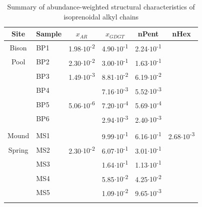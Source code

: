 \singlespace
\begin{table}
\centering
\begin{adjustbox}{width=\textwidth,keepaspectratio}
\begin{threeparttable}
  \caption{Summary of abundance-weighted structural characteristics of isoprenoidal alkyl chains}




\begin{tabular}{clllcc}
\toprule
Site  & Sample & \multicolumn{1}{c}{$x_{AR}$} & \multicolumn{1}{c}{$x_{GDGT}$} & nPent & nHex \\
\midrule
Bison & BP1   & 1.98$\cdot 10$\textsuperscript{-2} & 4.90$\cdot 10$\textsuperscript{-1} & 2.24$\cdot 10$\textsuperscript{-1} &  \\
Pool  & BP2   & 2.30$\cdot 10$\textsuperscript{-2} & 3.00$\cdot 10$\textsuperscript{-1} & 1.63$\cdot 10$\textsuperscript{-1} &  \\
      & BP3   & 1.49$\cdot 10$\textsuperscript{-3} & 8.81$\cdot 10$\textsuperscript{-2} & 6.19$\cdot 10$\textsuperscript{-2} &  \\
      & BP4   &       & 7.16$\cdot 10$\textsuperscript{-3} & 5.52$\cdot 10$\textsuperscript{-3} &  \\
      & BP5   & 5.06$\cdot 10$\textsuperscript{-6} & 7.20$\cdot 10$\textsuperscript{-4} & 5.69$\cdot 10$\textsuperscript{-4} &  \\
      & BP6   &       & 2.94$\cdot 10$\textsuperscript{-3} & 2.40$\cdot 10$\textsuperscript{-3} &  \\
      &       &       &       &       &  \\
Mound & MS1   &       & 9.99$\cdot 10$\textsuperscript{-1} & 6.16$\cdot 10$\textsuperscript{-1} & 2.68$\cdot 10$\textsuperscript{-3} \\
Spring & MS2   & 2.30$\cdot 10$\textsuperscript{-2} & 6.07$\cdot 10$\textsuperscript{-1} & 3.01$\cdot 10$\textsuperscript{-1} &  \\
      & MS3   &       & 1.64$\cdot 10$\textsuperscript{-1} & 1.13$\cdot 10$\textsuperscript{-1} &  \\
      & MS4   &       & 5.85$\cdot 10$\textsuperscript{-2} & 4.25$\cdot 10$\textsuperscript{-2} &  \\
      & MS5   &       & 1.09$\cdot 10$\textsuperscript{-2} & 9.65$\cdot 10$\textsuperscript{-3} &  \\
      &       &       &       &       &  \\

\end{tabular}
\end{threeparttable}
\end{adjustbox}
\end{table}
